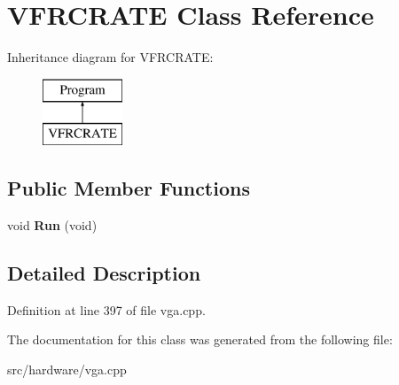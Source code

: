 \hypertarget{classVFRCRATE}{\section{V\-F\-R\-C\-R\-A\-T\-E Class Reference}
\label{classVFRCRATE}
}
Inheritance diagram for V\-F\-R\-C\-R\-A\-T\-E\-:\begin{figure}[H]
\begin{center}
\leavevmode
\includegraphics[height=2.000000cm]{classVFRCRATE}
\end{center}
\end{figure}
\subsection*{Public Member Functions}
\begin{DoxyCompactItemize}
\item 
\hypertarget{classVFRCRATE_ac9e54d65547f248ce6f97a91ebd73db2}{void {\bfseries Run} (void)}\label{classVFRCRATE_ac9e54d65547f248ce6f97a91ebd73db2}

\end{DoxyCompactItemize}


\subsection{Detailed Description}


Definition at line 397 of file vga.\-cpp.



The documentation for this class was generated from the following file\-:\begin{DoxyCompactItemize}
\item 
src/hardware/vga.\-cpp\end{DoxyCompactItemize}
